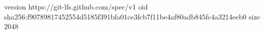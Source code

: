 version https://git-lfs.github.com/spec/v1
oid sha256:f90789817452554d5185f391bfa01ce3fcb7f11be4af80adb845fc4a3214eeb0
size 2048
